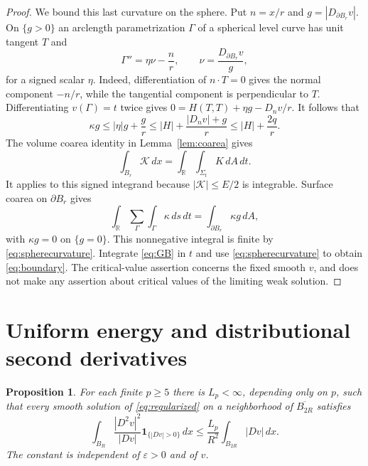 \documentclass[11pt]{article}
\newtheorem{proposition}[theorem]{Proposition}
\theoremstyle{remark}
\newcommand{\R}{\mathbb R}
\newcommand{\dd}{\,dx}
\newcommand{\dA}{\,dA}
\newcommand{\ds}{\,ds}
\newcommand{\eps}{\varepsilon}
\begin{document}
\begin{proof}
We bound this last curvature on the sphere. Put $n=x/r$ and
$g=|D_{\partial B_r}v|$. On $\{g>0\}$ an arclength parametrization
$\Gamma$ of a spherical level curve has unit tangent $T$ and
\[
 \Gamma''=\eta\nu-\frac nr,\qquad
 \nu=\frac{D_{\partial B_r}v}{g},
\]
for a signed scalar $\eta$. Indeed, differentiation of $n\cdot T=0$
gives the normal component $-n/r$, while the tangential component
is perpendicular to $T$.
Differentiating $v(\Gamma)=t$ twice gives
$0=H(T,T)+\eta g-D_nv/r$. It follows that
\begin{equation}\label{eq:spherecurvature}
 \kappa g\leq|\eta|g+\frac gr
 \leq |H|+\frac{|D_nv|+g}{r}
 \leq |H|+\frac{2q}{r}.
\end{equation}
The volume coarea identity in Lemma~\ref{lem:coarea} gives
\[
 \int_{B_r}\mathcal K\dd
   =\int_\R\int_{\Sigma_t}K\dA\,dt.
\]
It applies to this signed integrand because $|\mathcal K|\leq E/2$
is integrable. Surface coarea on $\partial B_r$ gives
\[
 \int_\R\sum_\Gamma\int_\Gamma\kappa\ds\,dt
   =\int_{\partial B_r}\kappa g\dA,
\]
with $\kappa g=0$ on $\{g=0\}$. This nonnegative integral is finite
by \eqref{eq:spherecurvature}. Integrate \eqref{eq:GB} in $t$
and use \eqref{eq:spherecurvature} to obtain \eqref{eq:boundary}.
The critical-value assertion concerns the fixed smooth $v$,
and does not make any assertion about critical values of the
limiting weak solution.
\end{proof}

\section{Uniform energy and distributional second derivatives}\label{sec:energy}

\begin{proposition}\label{prop:energy}
For each finite $p\geq5$ there is $L_p<\infty$, depending only
on $p$, such that every smooth solution of
\eqref{eq:regularized} on a neighborhood of $\overline{B_{2R}}$
satisfies
\begin{equation}\label{eq:energy}
 \int_{B_R}\frac{|D^2v|^2}{|Dv|}
       \mathbf1_{\{|Dv|>0\}}\dd
 \leq\frac{L_p}{R^2}\int_{B_{2R}}|Dv|\dd.
\end{equation}
The constant is independent of $\eps>0$ and of $v$.
\end{proposition}
\end{document}
